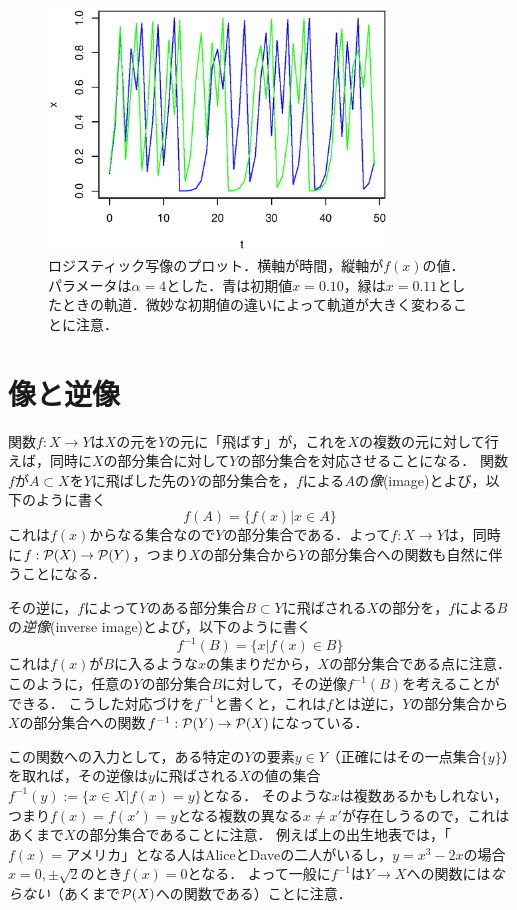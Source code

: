 \documentclass[11pt,a4paper]{bxjsarticle}
\begin{document}
\begin{figure}[ht]
      \centering
      \includegraphics[width=9cm]{figs/logistic.eps}
      \caption{ロジスティック写像のプロット．横軸が時間，縦軸が$f(x)$の値．パラメータは$\alpha=4$とした．青は初期値$x=0.10$，緑は$x=0.11$としたときの軌道．微妙な初期値の違いによって軌道が大きく変わることに注意．}
      \label{fig:logistic}
\end{figure}

\section{像と逆像}

関数$f:X \to Y$は$X$の元を$Y$の元に「飛ばす」が，これを$X$の複数の元に対して行えば，同時に$X$の部分集合に対して$Y$の部分集合を対応させることになる．
関数$f$が$A \subset X$を$Y$に飛ばした先の$Y$の部分集合を，$f$による$A$の\emph{像}(image)とよび，以下のように書く
\[
 f(A) = \{f(x)|x \in A\} 
\]
これは$f(x)$からなる集合なので$Y$の部分集合である．よって$f:X \to Y$は，同時に$f:\mathcal{P}(X) \to \mathcal{P}(Y)$，つまり$X$の部分集合から$Y$の部分集合への関数も自然に伴うことになる．

その逆に，$f$によって$Y$のある部分集合$B \subset Y$に飛ばされる$X$の部分を，$f$による$B$の\emph{逆像}(inverse image)とよび，以下のように書く
\[
 f^{-1}(B) = \{x|f(x) \in B\} 
\]
これは$f(x)$が$B$に入るような$x$の集まりだから，$X$の部分集合である点に注意．
このように，任意の$Y$の部分集合$B$に対して，その逆像$f^{-1}(B)$を考えることができる．
こうした対応づけを$f^{-1}$と書くと，これは$f$とは逆に，$Y$の部分集合から$X$の部分集合への関数$f^{-1}:\mathcal{P}(Y) \to \mathcal{P}(X)$になっている．

この関数への入力として，ある特定の$Y$の要素$y \in Y$（正確にはその一点集合$\{y\}$）を取れば，その逆像は$y$に飛ばされる$X$の値の集合$f^{-1}(y) := \{ x \in X | f(x) = y\}$となる．
そのような$x$は複数あるかもしれない，つまり$f(x) = f(x') = y$となる複数の異なる$x \neq x'$が存在しうるので，これはあくまで$X$の部分集合であることに注意．
例えば上の出生地表では，「$f(x)=\text{アメリカ}$」となる人はAliceとDaveの二人がいるし，$y=x^3-2x$の場合$x=0, \pm \sqrt{2}$のとき$f(x)=0$となる．
よって一般に$f^{-1}$は$Y \to X$への関数には\emph{ならない}（あくまで$\mathcal{P}(X)$への関数である）ことに注意．
\end{document}
